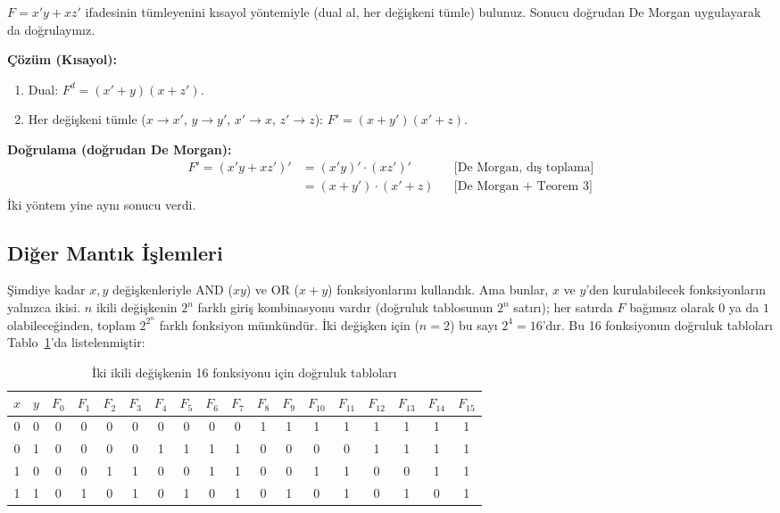\begin{alistirma}[\zor]
$F=x'y+xz'$ ifadesinin tümleyenini kısayol yöntemiyle (dual al, her değişkeni tümle)
bulunuz. Sonucu doğrudan De Morgan uygulayarak da doğrulayınız.
\end{alistirma}

\noindent\textbf{Çözüm (Kısayol):}
\begin{enumerate}[nosep, leftmargin=*]
    \item Dual: $F^d=(x'+y)(x+z')$.
    \item Her değişkeni tümle ($x\to x'$, $y\to y'$, $x'\to x$, $z'\to z$):
    $F'=(x+y')(x'+z)$.
\end{enumerate}

\noindent\textbf{Doğrulama (doğrudan De Morgan):}
\begin{align*}
F' = (x'y+xz')' &= (x'y)'\cdot(xz')' & &\text{[De Morgan, dış toplama]}\\
    &= (x+y')\cdot(x'+z) & &\text{[De Morgan + Teorem 3]}
\end{align*}
İki yöntem yine aynı sonucu verdi.

\subsection{Diğer Mantık İşlemleri}
\label{sec:diger-mantik-islemleri}

Şimdiye kadar $x,y$ değişkenleriyle AND ($xy$) ve OR ($x+y$) fonksiyonlarını kullandık.
Ama bunlar, $x$ ve $y$'den kurulabilecek fonksiyonların yalnızca ikisi. $n$ ikili
değişkenin $2^n$ farklı giriş kombinasyonu vardır (doğruluk tablosunun $2^n$ satırı); her
satırda $F$ bağımsız olarak $0$ ya da $1$ olabileceğinden, toplam $2^{2^n}$ farklı fonksiyon
mümkündür. İki değişken için ($n=2$) bu sayı $2^4=16$'dır. Bu 16 fonksiyonun doğruluk
tabloları Tablo~\ref{tab:16-fonksiyon}'da listelenmiştir:

\begin{table}[H]
\centering
{\small
\begin{tabular}{cc|cccccccccccccccc}
\toprule
$x$&$y$&$F_0$&$F_1$&$F_2$&$F_3$&$F_4$&$F_5$&$F_6$&$F_7$&$F_8$&$F_9$&$F_{10}$&$F_{11}$&$F_{12}$&$F_{13}$&$F_{14}$&$F_{15}$\\
\midrule
0&0&0&0&0&0&0&0&0&0&1&1&1&1&1&1&1&1\\
0&1&0&0&0&0&1&1&1&1&0&0&0&0&1&1&1&1\\
1&0&0&0&1&1&0&0&1&1&0&0&1&1&0&0&1&1\\
1&1&0&1&0&1&0&1&0&1&0&1&0&1&0&1&0&1\\
\bottomrule
\end{tabular}}
\caption{İki ikili değişkenin 16 fonksiyonu için doğruluk tabloları}
\label{tab:16-fonksiyon}
\end{table}

